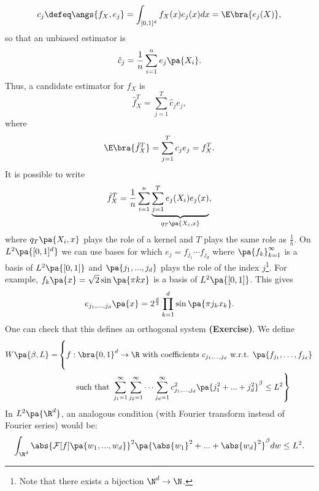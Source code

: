 \begin{equation*}
c_j \defeq \angs{f_X,e_j}=\int_{[0,1]^d}f_X(x)e_j(x)dx = \E\bra{e_j(X)},
\end{equation*}
so that an unbiased estimator is
\begin{equation*}
\hat{c}_j = \frac{1}{n}\sum_{i=1}^n e_j\pa{X_i}.
\end{equation*}
Thus, a candidate estimator for $f_X$ is
\begin{equation*}
  \hat{f}_X^T = \sum_{j=1}^T \hat{c}_j e_j,
\end{equation*} where
\begin{equation*}
\E\bra{\hat{f}_X^T}=\sum_{j=1}^T c_j e_j = f_X^T.
\end{equation*}
It is possible to write
\begin{equation*}
  \hat{f}_X^T=\frac{1}{n} \sum_{i=1}^n \underbrace{\sum_{j=1}^T e_j(X_i)e_j(x)}_{q_T\pa{X_i,x}},
\end{equation*}
where $q_T\pa{X_i,x}$ plays the role of a kernel and $T$ plays the same role as $\frac{1}{h}$.
On $L^2\pa{[0,1]^d}$ we can use bases for which $e_j=f_{j_1}\cdots f_{j_d}$ where $\pa{f_k}_{k=1}^\infty$ is a basis of $L^2\pa{[0,1]}$ and $\pa{j_1,...,j_d}$ plays the role of the index $j$\footnote{Note that there exists a bijection $\N^d\rightarrow \N$.}.
For example, $f_{k}\pa{x} = \sqrt{2}\sin\pa{\pi k x}$ is a basis of $L^2\pa{[0,1]}$.
This gives
\begin{equation*}
  e_{j_1,\ldots,j_d} \pa{x} = 2^{\frac{d}{2}} \prod_{k=1}^d \sin\pa{\pi j_k x_k}.
\end{equation*}
One can check that this defines an orthogonal system \textbf{(Exercise)}.
We define
\begin{equation*}
\begin{split}
W\pa{\beta, L} = &\left\{ \vphantom{\sum_{j_d=1}^\infty}f: \bra{0,1}^d\rightarrow \R \text{ with coefficients } c_{{j_1},\ldots,{j_d}}\text{ w.r.t. } \pa{f_{j_1}, \ldots, f_{j_d}} \right.  \\
&\quad\quad \left. \text{such that } \sum_{j_1=1}^\infty \sum_{j_2=1}^\infty\cdots \sum_{j_d=1}^\infty c_{j_1,...,j_d}^2\pa{j_1^2+...+j_d^2}^\beta\leq L^2 \right\}
\end{split}
\end{equation*}
{In $L^2\pa{\R^d}$, an analogous condition (with Fourier transform instead of Fourier series) would be:
\begin{equation*}
\int_{\R^d} \abs{\mathcal F[f]\pa{w_1,...,w_d}}^2\pa{\abs{w_1}^2+...+\abs{w_d}^2}^\beta dw \leq L^2.
\end{equation*}}

